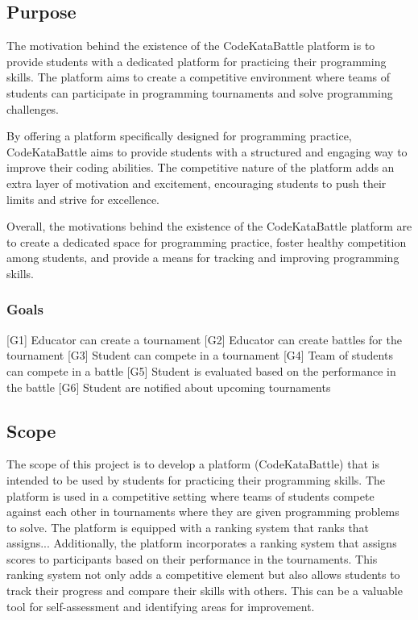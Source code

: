 \subsection{Purpose}
The motivation behind the existence of the CodeKataBattle platform is to provide students with a dedicated platform for practicing their programming skills. The platform aims to create a competitive environment where teams of students can participate in programming tournaments and solve programming challenges.

By offering a platform specifically designed for programming practice, CodeKataBattle aims to provide students with a structured and engaging way to improve their coding abilities. The competitive nature of the platform adds an extra layer of motivation and excitement, encouraging students to push their limits and strive for excellence.

Overall, the motivations behind the existence of the CodeKataBattle platform are to create a dedicated space for programming practice, foster healthy competition among students, and provide a means for tracking and improving programming skills.

\subsubsection{Goals}
[G1] Educator can create a tournament
[G2] Educator can create battles for the tournament
[G3] Student can compete in a tournament
[G4] Team of students can compete in a battle
[G5] Student is evaluated based on the performance in the battle
[G6] Student are notified about upcoming tournaments

\subsection{Scope}
The scope of this project is to develop a platform (CodeKataBattle) that is intended to be used by students for practicing their programming skills.
The platform is used in a competitive setting where teams of students compete against each other in tournaments where they are given programming problems to solve.
The platform is equipped with a ranking system that ranks that assigns...
Additionally, the platform incorporates a ranking system that assigns scores to participants based on their performance in the tournaments. This ranking system not only adds a competitive element but also allows students to track their progress and compare their skills with others. This can be a valuable tool for self-assessment and identifying areas for improvement.

